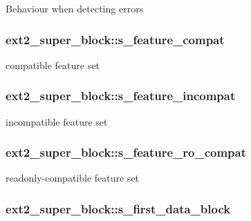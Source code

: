 Behaviour when detecting errors \hypertarget{structext2__super__block_a1cf404a1bcfb748e924c62032cd723a5}{
\subsubsection[{s\-\_\-feature\-\_\-compat}]{ ext2\-\_\-super\-\_\-block\-::s\-\_\-feature\-\_\-compat}}\label{structext2__super__block_a1cf404a1bcfb748e924c62032cd723a5}
compatible feature set \hypertarget{structext2__super__block_a56005d1ae97dc32f86567d018c753440}{
\subsubsection[{s\-\_\-feature\-\_\-incompat}]{ ext2\-\_\-super\-\_\-block\-::s\-\_\-feature\-\_\-incompat}}\label{structext2__super__block_a56005d1ae97dc32f86567d018c753440}
incompatible feature set \hypertarget{structext2__super__block_a9c63e7954f0344d3de19aad4099d84c7}{
\subsubsection[{s\-\_\-feature\-\_\-ro\-\_\-compat}]{ ext2\-\_\-super\-\_\-block\-::s\-\_\-feature\-\_\-ro\-\_\-compat}}\label{structext2__super__block_a9c63e7954f0344d3de19aad4099d84c7}
readonly-\/compatible feature set \hypertarget{structext2__super__block_ab7c5dfba6eafbb1974f7628d4ae32601}{
\subsubsection[{s\-\_\-first\-\_\-data\-\_\-block}]{ ext2\-\_\-super\-\_\-block\-::s\-\_\-first\-\_\-data\-\_\-block}}\label{structext2__super__block_ab7c5dfba6eafbb1974f7628d4ae32601}

